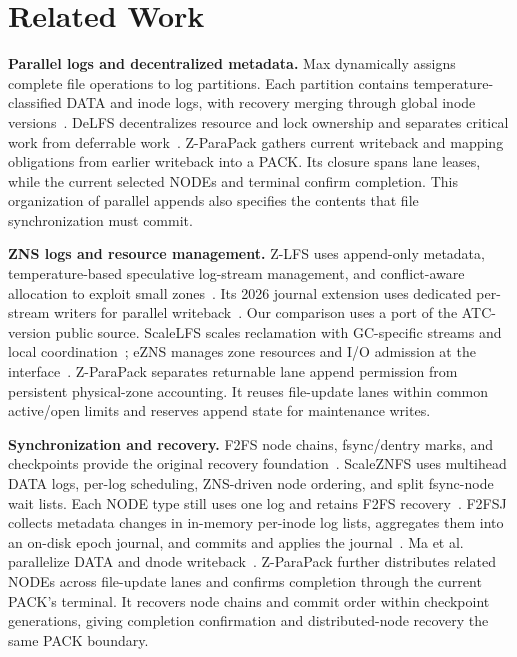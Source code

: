 \section{Related Work}\label{sec:related}
\textbf{Parallel logs and decentralized metadata.}
Max dynamically assigns complete file operations to log partitions.
Each partition contains temperature-classified DATA and inode logs, with recovery merging through global inode versions~\cite{r2}.
DeLFS decentralizes resource and lock ownership and separates critical work from deferrable work~\cite{r4}.
Z-ParaPack gathers current writeback and mapping obligations from earlier writeback into a PACK.
Its closure spans lane leases, while the current selected NODEs and terminal confirm completion.
This organization of parallel appends also specifies the contents that file synchronization must commit.

\textbf{ZNS logs and resource management.}
Z-LFS uses append-only metadata, temperature-based speculative log-stream management, and conflict-aware allocation to exploit small zones~\cite{r5}.
Its 2026 journal extension uses dedicated per-stream writers for parallel writeback~\cite{r17}.
Our comparison uses a port of the ATC-version public source.
ScaleLFS scales reclamation with GC-specific streams and local coordination~\cite{r8}; eZNS manages zone resources and I/O admission at the interface~\cite{r9}.
Z-ParaPack separates returnable lane append permission from persistent physical-zone accounting.
It reuses file-update lanes within common active/open limits and reserves append state for maintenance writes.

\textbf{Synchronization and recovery.}
F2FS node chains, fsync/dentry marks, and checkpoints provide the original recovery foundation~\cite{r1}.
ScaleZNFS uses multihead DATA logs, per-log scheduling, ZNS-driven node ordering, and split fsync-node wait lists.
Each NODE type still uses one log and retains F2FS recovery~\cite{r3}.
F2FSJ collects metadata changes in in-memory per-inode log lists, aggregates them into an on-disk epoch journal, and commits and applies the journal~\cite{r7}.
Ma et al. parallelize DATA and dnode writeback~\cite{r6}.
Z-ParaPack further distributes related NODEs across file-update lanes and confirms completion through the current PACK's terminal.
It recovers node chains and commit order within checkpoint generations, giving completion confirmation and distributed-node recovery the same PACK boundary.
